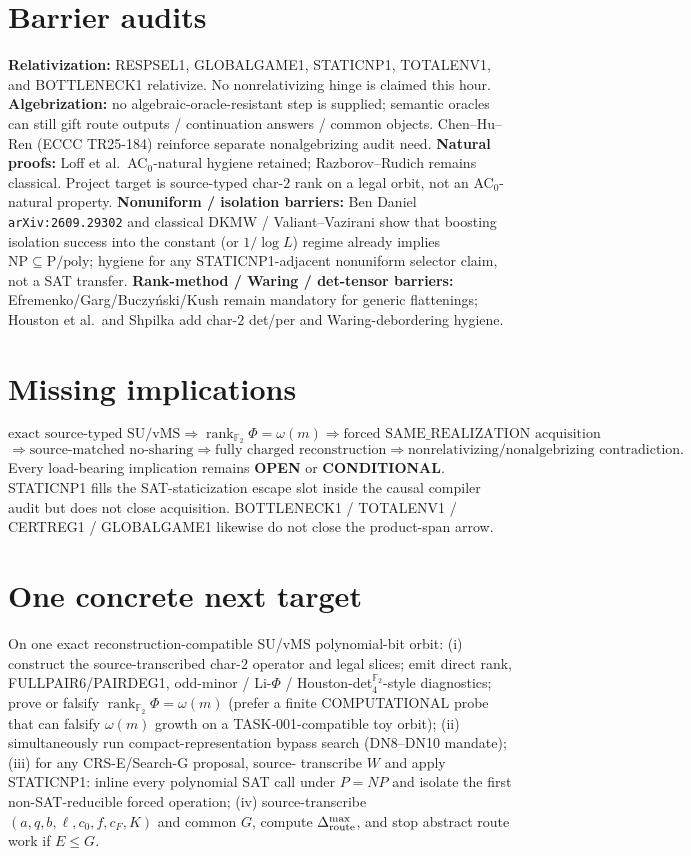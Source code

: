 \documentclass[11pt]{article}
\begin{document}
\section*{Barrier audits}
\textbf{Relativization:} RESPSEL1, GLOBALGAME1, STATICNP1, TOTALENV1, and
BOTTLENECK1 relativize. No nonrelativizing hinge is claimed this hour.
\textbf{Algebrization:} no algebraic-oracle-resistant step is supplied;
semantic oracles can still gift route outputs / continuation answers / common
objects. Chen--Hu--Ren (ECCC TR25-184) reinforce separate nonalgebrizing audit need.
\textbf{Natural proofs:} Loff et al.\ AC$_0$-natural hygiene retained;
Razborov--Rudich remains classical. Project target is source-typed char-$2$
rank on a legal orbit, not an AC$_0$-natural property.
\textbf{Nonuniform / isolation barriers:} Ben Daniel \texttt{arXiv:2609.29302}
and classical DKMW / Valiant--Vazirani show that boosting isolation success into
the constant (or $1/\log L$) regime already implies $\mathrm{NP}\subseteq\mathrm{P/poly}$;
hygiene for any STATICNP1-adjacent nonuniform selector claim, not a SAT transfer.
\textbf{Rank-method / Waring / det-tensor barriers:} Efremenko/Garg/Buczy\'nski/Kush
remain mandatory for generic flattenings; Houston et al.\ and Shpilka add
char-$2$ det/per and Waring-debordering hygiene.

\section*{Missing implications}
\[
\text{exact source-typed SU/vMS}
\Longrightarrow
\operatorname{rank}_{\mathbb F_2}\Phi=\omega(m)
\Longrightarrow
\text{forced SAME\_REALIZATION acquisition}
\]
\[
\Longrightarrow
\text{source-matched no-sharing}
\Longrightarrow
\text{fully charged reconstruction}
\Longrightarrow
\text{nonrelativizing/nonalgebrizing contradiction}.
\]
Every load-bearing implication remains \textbf{OPEN} or \textbf{CONDITIONAL}.
STATICNP1 fills the SAT-staticization escape slot inside the causal compiler audit
but does not close acquisition. BOTTLENECK1 / TOTALENV1 / CERTREG1 / GLOBALGAME1
likewise do not close the product-span arrow.

\section*{One concrete next target}
On one exact reconstruction-compatible SU/vMS polynomial-bit orbit: (i) construct
the source-transcribed char-$2$ operator and legal slices; emit direct rank,
FULLPAIR6/PAIRDEG1, odd-minor / Li-$\Phi$ / Houston-det$_4^{\mathbb F_2}$-style
diagnostics; prove or falsify $\boxed{\operatorname{rank}_{\mathbb F_2}\Phi=\omega(m)}$
(prefer a finite COMPUTATIONAL probe that can falsify $\omega(m)$ growth on a
TASK-001-compatible toy orbit); (ii) simultaneously run compact-representation
bypass search (DN8--DN10 mandate); (iii) for any CRS-E/Search-G proposal, source-
transcribe $W$ and apply STATICNP1: inline every polynomial SAT call under $P=NP$
and isolate the first non-SAT-reducible forced operation; (iv) source-transcribe
$(a,q,b,\ell,c_0,f,c_F,K)$ and common $G$, compute $\Delta_{\rm route}^{\max}$,
and stop abstract route work if $E\le G$.
\end{document}
